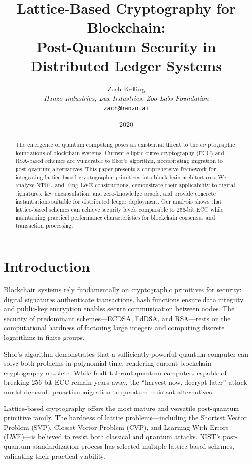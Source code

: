 \documentclass[11pt,a4paper]{article}
\title{Lattice-Based Cryptography for Blockchain:\\Post-Quantum Security in Distributed Ledger Systems}
\author{Zach Kelling\\
\textit{Hanzo Industries, Lux Industries, Zoo Labs Foundation}\\
\texttt{zach@hanzo.ai}}
\date{2020}
\begin{document}
\maketitle

\begin{abstract}
The emergence of quantum computing poses an existential threat to the cryptographic foundations of blockchain systems. Current elliptic curve cryptography (ECC) and RSA-based schemes are vulnerable to Shor's algorithm, necessitating migration to post-quantum alternatives. This paper presents a comprehensive framework for integrating lattice-based cryptographic primitives into blockchain architectures. We analyze NTRU and Ring-LWE constructions, demonstrate their applicability to digital signatures, key encapsulation, and zero-knowledge proofs, and provide concrete instantiations suitable for distributed ledger deployment. Our analysis shows that lattice-based schemes can achieve security levels comparable to 256-bit ECC while maintaining practical performance characteristics for blockchain consensus and transaction processing.
\end{abstract}

\section{Introduction}

Blockchain systems rely fundamentally on cryptographic primitives for security: digital signatures authenticate transactions, hash functions ensure data integrity, and public-key encryption enables secure communication between nodes. The security of predominant schemes---ECDSA, EdDSA, and RSA---rests on the computational hardness of factoring large integers and computing discrete logarithms in finite groups.

Shor's algorithm \cite{shor1994} demonstrates that a sufficiently powerful quantum computer can solve both problems in polynomial time, rendering current blockchain cryptography obsolete. While fault-tolerant quantum computers capable of breaking 256-bit ECC remain years away, the ``harvest now, decrypt later'' attack model demands proactive migration to quantum-resistant alternatives.

Lattice-based cryptography offers the most mature and versatile post-quantum primitive family. The hardness of lattice problems---including the Shortest Vector Problem (SVP), Closest Vector Problem (CVP), and Learning With Errors (LWE)---is believed to resist both classical and quantum attacks. NIST's post-quantum standardization process has selected multiple lattice-based schemes, validating their practical viability.
\end{document}

